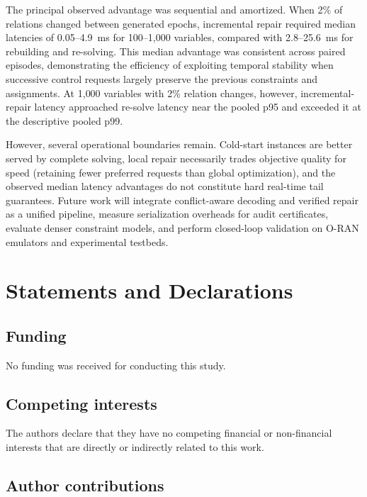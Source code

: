 \documentclass[pdflatex,sn-mathphys-num,iicol,oneside]{sn-jnl}
\begin{document}
The principal observed advantage was sequential and amortized. When 2\% of relations changed between generated epochs, incremental repair required median latencies of 0.05--4.9~ms for 100--1{,}000 variables, compared with 2.8--25.6~ms for rebuilding and re-solving. This median advantage was consistent across paired episodes, demonstrating the efficiency of exploiting temporal stability when successive control requests largely preserve the previous constraints and assignments. At 1{,}000 variables with 2\% relation changes, however, incremental-repair latency approached re-solve latency near the pooled p95 and exceeded it at the descriptive pooled p99.

However, several operational boundaries remain. Cold-start instances are better served by complete solving, local repair necessarily trades objective quality for speed (retaining fewer preferred requests than global optimization), and the observed median latency advantages do not constitute hard real-time tail guarantees. Future work will integrate conflict-aware decoding and verified repair as a unified pipeline, measure serialization overheads for audit certificates, evaluate denser constraint models, and perform closed-loop validation on O-RAN emulators and experimental testbeds.

\section*{Statements and Declarations}

\subsection*{Funding}

No funding was received for conducting this study.

\subsection*{Competing interests}

The authors declare that they have no competing financial or
non-financial interests that are directly or indirectly related to
this work.

\subsection*{Author contributions}
\end{document}
